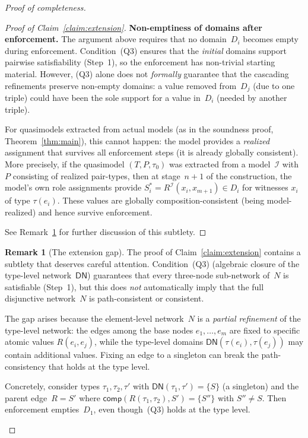 \documentclass[a4paper,11pt]{article}
\theoremstyle{definition}
\newtheorem{remark}[theorem]{Remark}
\newcommand{\interp}{\ensuremath{\mathcal{I}}}
\newcommand{\comp}{\ensuremath{\mathsf{comp}}}
\begin{document}
\begin{proof}[Proof of completeness]
\begin{proof}[Proof of Claim~\ref{claim:extension}]
\smallskip\noindent
\textbf{Non-emptiness of domains after enforcement.}\;
The argument above requires that no domain~$D_i$ becomes empty during
enforcement.  Condition~(Q3) ensures that the \emph{initial} domains
support pairwise satisfiability (Step~1), so the enforcement has
non-trivial starting material.  However, (Q3) alone does not
\emph{formally} guarantee that the cascading refinements preserve
non-empty domains: a value removed from~$D_j$ (due to one triple)
could have been the sole support for a value in~$D_i$ (needed by
another triple).

For quasimodels extracted from actual models (as in the soundness
proof, Theorem~\ref{thm:main}), this cannot happen: the model
provides a \emph{realized} assignment that survives all enforcement
steps (it is already globally consistent).  More precisely, if the
quasimodel $(T, P, \tau_0)$ was extracted from a model~$\interp$ with
$P$ consisting of realized pair-types, then at stage~$n+1$ of the
construction, the model's own role assignments provide
$S_i^* = R^{\interp}(x_i, x_{m+1}) \in D_i$ for witnesses $x_i$ of
type $\tau(e_i)$.  These values are globally composition-consistent
(being model-realized) and hence survive enforcement.

See Remark~\ref{rem:extension-gap} for further discussion of this
subtlety.
\end{proof}

\begin{remark}[The extension gap]
\label{rem:extension-gap}
The proof of Claim~\ref{claim:extension} contains a subtlety that
deserves careful attention.  Condition~(Q3) (algebraic closure of the
type-level network~$\mathsf{DN}$) guarantees that every three-node
sub-network of~$N$ is satisfiable (Step~1), but this does \emph{not}
automatically imply that the full disjunctive network~$N$ is
path-consistent or consistent.

The gap arises because the element-level network~$N$ is a
\emph{partial refinement} of the type-level network: the edges among
the base nodes $e_1, \ldots, e_m$ are fixed to specific atomic values
$R(e_i, e_j)$, while the type-level domains $\mathsf{DN}(\tau(e_i),
\tau(e_j))$ may contain additional values.  Fixing an edge to a
singleton can break the path-consistency that holds at the type level.

Concretely, consider types $\tau_1, \tau_2, \tau'$ with
$\mathsf{DN}(\tau_1, \tau') = \{S\}$ (a singleton) and the parent
edge~$R = S'$ where $\comp(R(\tau_1, \tau_2), S') = \{S''\}$ with
$S'' \neq S$.  Then enforcement empties~$D_1$, even though~(Q3)
holds at the type level.


\end{remark}
\end{proof}
\end{document}
